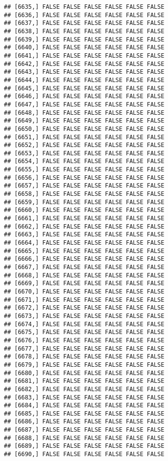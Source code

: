 \documentclass[
]{article}
\begin{document}
\begin{verbatim}
## [6635,] FALSE FALSE FALSE FALSE FALSE FALSE
## [6636,] FALSE FALSE FALSE FALSE FALSE FALSE
## [6637,] FALSE FALSE FALSE FALSE FALSE FALSE
## [6638,] FALSE FALSE FALSE FALSE FALSE FALSE
## [6639,] FALSE FALSE FALSE FALSE FALSE FALSE
## [6640,] FALSE FALSE FALSE FALSE FALSE FALSE
## [6641,] FALSE FALSE FALSE FALSE FALSE FALSE
## [6642,] FALSE FALSE FALSE FALSE FALSE FALSE
## [6643,] FALSE FALSE FALSE FALSE FALSE FALSE
## [6644,] FALSE FALSE FALSE FALSE FALSE FALSE
## [6645,] FALSE FALSE FALSE FALSE FALSE FALSE
## [6646,] FALSE FALSE FALSE FALSE FALSE FALSE
## [6647,] FALSE FALSE FALSE FALSE FALSE FALSE
## [6648,] FALSE FALSE FALSE FALSE FALSE FALSE
## [6649,] FALSE FALSE FALSE FALSE FALSE FALSE
## [6650,] FALSE FALSE FALSE FALSE FALSE FALSE
## [6651,] FALSE FALSE FALSE FALSE FALSE FALSE
## [6652,] FALSE FALSE FALSE FALSE FALSE FALSE
## [6653,] FALSE FALSE FALSE FALSE FALSE FALSE
## [6654,] FALSE FALSE FALSE FALSE FALSE FALSE
## [6655,] FALSE FALSE FALSE FALSE FALSE FALSE
## [6656,] FALSE FALSE FALSE FALSE FALSE FALSE
## [6657,] FALSE FALSE FALSE FALSE FALSE FALSE
## [6658,] FALSE FALSE FALSE FALSE FALSE FALSE
## [6659,] FALSE FALSE FALSE FALSE FALSE FALSE
## [6660,] FALSE FALSE FALSE FALSE FALSE FALSE
## [6661,] FALSE FALSE FALSE FALSE FALSE FALSE
## [6662,] FALSE FALSE FALSE FALSE FALSE FALSE
## [6663,] FALSE FALSE FALSE FALSE FALSE FALSE
## [6664,] FALSE FALSE FALSE FALSE FALSE FALSE
## [6665,] FALSE FALSE FALSE FALSE FALSE FALSE
## [6666,] FALSE FALSE FALSE FALSE FALSE FALSE
## [6667,] FALSE FALSE FALSE FALSE FALSE FALSE
## [6668,] FALSE FALSE FALSE FALSE FALSE FALSE
## [6669,] FALSE FALSE FALSE FALSE FALSE FALSE
## [6670,] FALSE FALSE FALSE FALSE FALSE FALSE
## [6671,] FALSE FALSE FALSE FALSE FALSE FALSE
## [6672,] FALSE FALSE FALSE FALSE FALSE FALSE
## [6673,] FALSE FALSE FALSE FALSE FALSE FALSE
## [6674,] FALSE FALSE FALSE FALSE FALSE FALSE
## [6675,] FALSE FALSE FALSE FALSE FALSE FALSE
## [6676,] FALSE FALSE FALSE FALSE FALSE FALSE
## [6677,] FALSE FALSE FALSE FALSE FALSE FALSE
## [6678,] FALSE FALSE FALSE FALSE FALSE FALSE
## [6679,] FALSE FALSE FALSE FALSE FALSE FALSE
## [6680,] FALSE FALSE FALSE FALSE FALSE FALSE
## [6681,] FALSE FALSE FALSE FALSE FALSE FALSE
## [6682,] FALSE FALSE FALSE FALSE FALSE FALSE
## [6683,] FALSE FALSE FALSE FALSE FALSE FALSE
## [6684,] FALSE FALSE FALSE FALSE FALSE FALSE
## [6685,] FALSE FALSE FALSE FALSE FALSE FALSE
## [6686,] FALSE FALSE FALSE FALSE FALSE FALSE
## [6687,] FALSE FALSE FALSE FALSE FALSE FALSE
## [6688,] FALSE FALSE FALSE FALSE FALSE FALSE
## [6689,] FALSE FALSE FALSE FALSE FALSE FALSE
## [6690,] FALSE FALSE FALSE FALSE FALSE FALSE

\end{verbatim}
\end{document}
